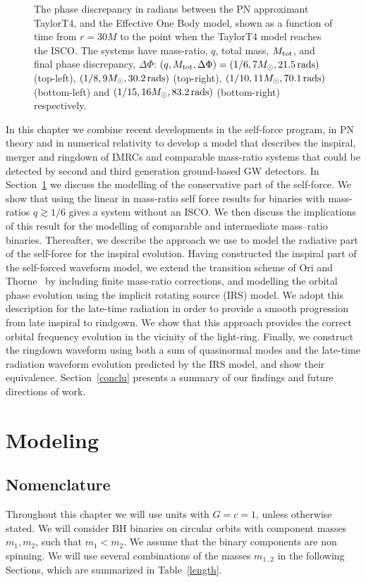 \begin{figure}
{}
\caption{The phase discrepancy in radians between the PN approximant TaylorT4, and the Effective One Body model, shown as a function of time from \(r=30M\) to the point when the TaylorT4 model reaches the ISCO. The systems have mass-ratio, $q$, total mass, \(M_{{\rm{tot}}}\), and final phase discrepancy, $\Delta\Phi$: $(q, M_{\rm tot}, \Delta\Phi) = (1/6, 7M_{\odot},21.5\,{\rm rads})$ (top-left), $(1/8, 9M_{\odot},30.2\,{\rm rads})$ (top-right), $(1/10, 11M_{\odot},70.1\,{\rm rads})$ (bottom-left) and $(1/15, 16M_{\odot},83.2\,{\rm rads})$ (bottom-right) respectively.}
\label{pn_approx}
\end{figure}


In this chapter we combine recent developments in the self-force program, in PN theory and in numerical relativity to develop a model that describes the inspiral, merger and ringdown of IMRCs and comparable mass-ratio systems that could be detected by second and third generation ground-based GW detectors. In Section~\ref{one} we discuss the modelling of the conservative part of the self-force. We show that using the linear in mass-ratio self force results for binaries with mass-ratios \(q\gtrsim1/6\) gives a system without an ISCO. We then discuss the implications of this result for the modelling of comparable and intermediate mass--ratio binaries.  Thereafter, we describe the approach we use to model the radiative part of the self-force for the inspiral evolution. Having constructed the inspiral part of the self-forced waveform model, we extend the transition scheme of  Ori and Thorne~\cite{ori} by including finite mass-ratio corrections, and modelling the orbital phase evolution using the implicit rotating 
source (IRS) model. We adopt this description for the late-time radiation in order to provide a smooth progression from late inspiral to rindgown.  We show that this approach provides the correct orbital frequency evolution in the vicinity of the light-ring. Finally, we construct the ringdown waveform using both a sum of quasinormal modes and the late-time radiation waveform evolution predicted by the IRS model, and show their equivalence. Section~\ref{conclu} presents a summary of our findings and future directions of work. 


\section{Modeling}
\label{one}


\subsection{Nomenclature}
Throughout this chapter we will use units with \(G=c=1\), unless otherwise stated. We will consider BH  binaries on circular orbits with component masses \(m_1, m_2\), such that \(m_1 < m_2\). We assume that the binary components are non spinning. We will use several combinations of the masses \(m_{1\, ,2}\) in the following Sections, which are summarized in Table~\ref{length}. 

